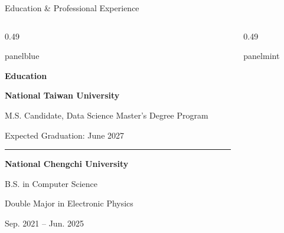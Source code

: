 \documentclass[aspectratio=169,10pt]{beamer}
\begin{document}
\begin{frame}{Education \& Professional Experience}
  \vspace{0.05cm}

  \begin{columns}[T,onlytextwidth]

    \begin{column}{0.49\textwidth}
      \begin{beamercolorbox}[
        rounded=true,sep=0.20cm,wd=\linewidth
      ]{panelblue}

        {\large\bfseries\color{AccentBlue}
          Education}\par
        \vspace{0.24cm}

        {\normalsize\bfseries
          National Taiwan University}\par
        \vspace{0.06cm}
        {\normalsize
          M.S. Candidate, Data Science
          Master's Degree Program}\par
        \vspace{0.05cm}
        {\small\color{Muted}
          Expected Graduation: June 2027}\par

        \vspace{0.26cm}
        {\color{Divider}\rule{0.92\linewidth}{0.4pt}}
        \vspace{0.19cm}

        {\normalsize\bfseries
          National Chengchi University}\par
        \vspace{0.06cm}
        {\normalsize
          B.S. in Computer Science}\par
        {\normalsize
          Double Major in Electronic Physics}\par
        \vspace{0.05cm}
        {\small\color{Muted}
          Sep. 2021 -- Jun. 2025}\par

      \end{beamercolorbox}
    \end{column}

    \begin{column}{0.49\textwidth}
      \begin{beamercolorbox}[
        rounded=true,sep=0.20cm,wd=\linewidth
      ]{panelmint}


\end{beamercolorbox}
\end{column}
\end{columns}
\end{frame}
\end{document}
